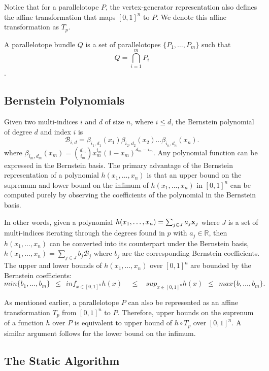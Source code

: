 %
Notice that for a parallelotope $P$, the vertex-generator representation also defines the affine transformation that maps $[0,1]^{n}$ to $P$.
%
We denote this affine transformation as $T_{p}$.
%
\begin{definition}
A parallelotope bundle $Q$ is a set of parallelotopes $\{P_1, \ldots, P_m\}$ such that
  $$ Q = \bigcap_{i=1}^{m}P_i $$.
\end{definition}


\subsection{Bernstein Polynomials}
\label{sec:bernstein}

Given two multi-indices $i$ and $d$ of size $n$, where $i \leq d$, the Bernstein polynomial of degree $d$ and index $i$ is
$$
\mathcal{B}_{i,d} = \beta_{i_1,d_1}(x_1) \beta_{i_2,d_2}(x_2)\ldots \beta_{i_n,d_n}(x_n).
$$
%
where $\beta_{i_m,d_m}(x_m) = \binom{d_m}{i_m}x_{m}^{i_m}(1-x_m)^{d_m - i_m}$.
%
Any polynomial function can be expressed in the Bernstein basis.
%
The primary advantage of the Bernstein representation of a polynomial $h(x_1,...,x_n)$ is that an upper bound on the supremum and lower bound on the infimum of $h(x_1,...,x_n)$ in $[0,1]^{n}$ can be computed purely by observing the coefficients of the polynomial in the Bernstein basis.

In other words, given a polynomial $h(x_1,\ldots,x_n) = \sum_{j \in J} a_j {\bf x}_{j}$ where $J$ is a set of multi-indices iterating through the degrees found in $p$ with $a_j \in \mathbb{R}$, then $h(x_1,\ldots,x_n)$ can be converted into its counterpart under the Bernstein basis, $h(x_1,\ldots,x_n) = \sum_{j \in J} b_j \mathcal{B}_j $ where $b_j$ are the corresponding Bernstein coefficients.
%
The upper and lower bounds of $h(x_1,\ldots,x_n)$ over $[0,1]^n$ are bounded by the Bernstein coefficients:
$$
min \{b_1, \ldots, b_m\} ~~\leq~~ inf_{x \in [0,1]^n} h(x) ~~~~~\leq~~~~ sup_{x \in [0,1]^{n}} h(x) ~~\leq~~ max \{b, \ldots, b_m\}.
$$

As mentioned earlier, a parallelotope $P$ can also be represented as an affine transformation $T_{p}$ from $[0,1]^{n}$ to $P$.
%
Therefore, upper bounds on the suprenum of a function $h$ over $P$ is equivalent to upper bound of $h \circ T_{p}$ over $[0,1]^{n}$.
%
A similar argument follows for the lower bound on the infimum.

\subsection{The Static Algorithm}
\label{sec:static}

